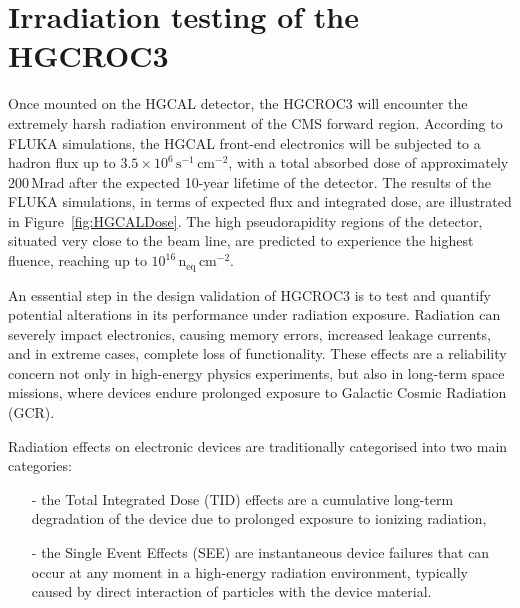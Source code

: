 \section{Irradiation testing of the HGCROC3}
\label{sec:The HGCROC3 irradiation testing}

Once mounted on the HGCAL detector, the HGCROC3 will encounter the extremely harsh radiation environment of the CMS forward region. According to FLUKA \cite{Fassò:277533} simulations, the HGCAL front-end electronics will be subjected to a hadron flux up to $3.5\times10^6\,\textrm{s}^{-1}\,\textrm{cm}^{-2}$, with a total absorbed dose of approximately $200\,\textrm{Mrad}$ after the expected 10-year lifetime of the detector. 
The results of the FLUKA simulations, in terms of expected flux and integrated dose, are illustrated in Figure~\ref{fig:HGCALDose}. The high pseudorapidity regions of the detector, situated very close to the beam line, are predicted to experience the highest fluence, reaching up to $10^{16}\,\textrm{n}_{\textrm{eq}}\,\textrm{cm}^{-2}$.

\bigbreak

An essential step in the design validation of HGCROC3 is to test and quantify potential alterations in its performance under radiation exposure.
Radiation can severely impact electronics, causing memory errors, increased leakage currents, and in extreme cases, complete loss of functionality. These effects are a reliability concern not only in high-energy physics experiments, but also in long-term space missions, where devices endure prolonged exposure to Galactic Cosmic Radiation (GCR).

Radiation effects on electronic devices are traditionally categorised into two main categories:
\begin{itemize}
    \item [-] the Total Integrated Dose (TID) effects are a cumulative long-term degradation of the device due to prolonged exposure to ionizing radiation,
    \item [-] the Single Event Effects (SEE) are instantaneous device failures that can occur at any moment in a high-energy radiation environment, typically caused by direct interaction of particles with the device material.
\end{itemize}

